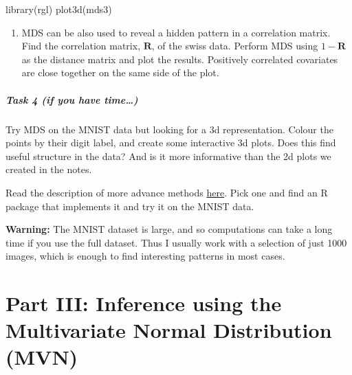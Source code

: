 \documentclass[
]{book}
\newenvironment{Shaded}{\begin{snugshade}}{\end{snugshade}}
\newcommand{\FunctionTok}[1]{\textcolor[rgb]{0.00,0.00,0.00}{#1}}
\newcommand{\NormalTok}[1]{#1}
\providecommand{\tightlist}{%
  \setlength{\itemsep}{0pt}\setlength{\parskip}{0pt}}
\theoremstyle{definition}
\theoremstyle{definition}
\theoremstyle{definition}
\theoremstyle{definition}
\theoremstyle{remark}
\begin{document}
\begin{Shaded}
\begin{Highlighting}[]
\FunctionTok{library}\NormalTok{(rgl)}
\FunctionTok{plot3d}\NormalTok{(mds3)}
\end{Highlighting}
\end{Shaded}

\begin{enumerate}
\def\labelenumi{\roman{enumi}.}
\setcounter{enumi}{2}
\tightlist
\item
  MDS can be also used to reveal a hidden pattern in a correlation matrix. Find the correlation matrix, \(\mathbf R\), of the swiss data. Perform MDS using \(1-\mathbf R\) as the distance matrix and plot the results. Positively correlated covariates are close together on the same side of the plot.
\end{enumerate}

\hypertarget{task-4-if-you-have-time}{%
\paragraph*{Task 4 (if you have time\ldots)}\label{task-4-if-you-have-time}}

Try MDS on the MNIST data but looking for a 3d representation. Colour the points by their digit label, and create some interactive 3d plots. Does this find useful structure in the data? And is it more informative than the 2d plots we created in the notes.

Read the description of more advance methods \href{https://colah.github.io/posts/2014-10-Visualizing-MNIST/}{here}. Pick one and find an R package that implements it and try it on the MNIST data.

\textbf{Warning:} The MNIST dataset is large, and so computations can take a long time if you use the full dataset. Thus I usually work with a selection of just 1000 images, which is enough to find interesting patterns in most cases.

\hypertarget{part-iii-inference-using-the-multivariate-normal-distribution-mvn}{%
\chapter*{Part III: Inference using the Multivariate Normal Distribution (MVN)}\label{part-iii-inference-using-the-multivariate-normal-distribution-mvn}}
\end{document}

